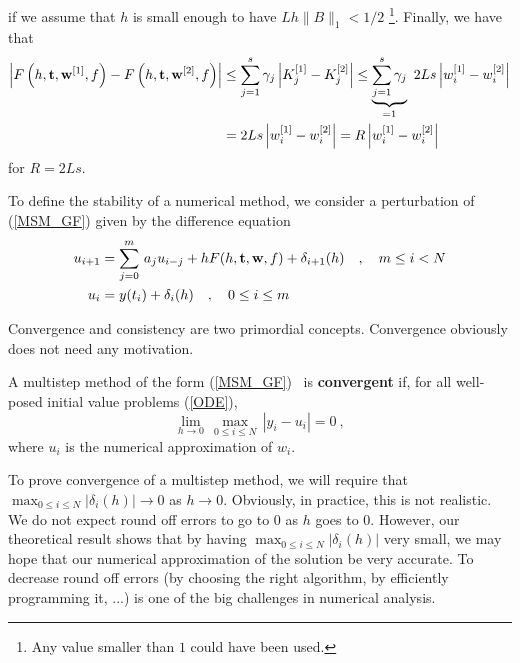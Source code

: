 \begin{enumerate}
\[\]
if we assume that $h$ is small enough to have $L h\|B\|_1 < 1/2$
\footnote{Any value smaller than $1$ could have been used.}.
Finally, we have that
\begin{align*}
\left| F\left(h,\mathbf{t},\mathbf{w}^{[1]},f\right)
- F\left(h,\mathbf{t},\mathbf{w}^{[2]},f\right) \right|
&\leq \sum_{j=1}^s \gamma_j \left| K_j^{[1]} - K_j^{[2]}\right|
\leq \underbrace{\sum_{j=1}^s \gamma_j}_{=1}
\ 2 L s \left| w_i^{[1]} - w_i^{[2]} \right| \\
&= 2 L s \left| w_i^{[1]} - w_i^{[2]} \right|
= R \left| w_i^{[1]} - w_i^{[2]} \right|
\end{align*}
for $\displaystyle R = 2 L s$.
\end{enumerate}

To define the stability of a numerical method, we consider a perturbation
of (\ref{MSM_GF}) given by the difference equation
\begin{equation} \label{MSM_GFpertub}
\begin{split}
u_{i+1} &= \sum_{j=0}^m\,a_ju_{i-j} + h F(h,\mathbf{t},\mathbf{w},f)
+ \delta_{i+1}(h) \quad, \quad m\leq i < N \\
u_i &= y(t_i) + \delta_i(h) \quad, \quad 0 \leq i \leq m
\end{split}
\end{equation}

Convergence and consistency are two primordial concepts.  Convergence
obviously does not need any motivation. 

\begin{defn}
A multistep method of the form (\ref{MSM_GF}) \footnotemark\ is
{\bfseries convergent} if,
for all well-posed initial value problems (\ref{ODE}),
\[
\lim_{h \rightarrow 0}\,\max_{0\leq i \leq N} \,|y_i - u_i| = 0 \ ,
\]
where $u_i$ is the numerical approximation of $w_i$.
\label{methodConv}
\end{defn}


\begin{rmk}
To prove convergence of a multistep method, we will require that
$\displaystyle \max_{0\leq i \leq N} |\delta_i(h)| \to 0$ as $h\to 0$.
Obviously, in practice, this is not realistic.  We do not expect
round off errors to go to $0$ as $h$ goes to $0$.  However, our
theoretical result shows that by having 
$\displaystyle \max_{0\leq i \leq N} |\delta_i(h)|$ very small,
we may hope that our numerical approximation of the solution be
very accurate.  To decrease round off errors (by choosing
the right algorithm, by efficiently programming it, ...) is one of
the big challenges in numerical analysis.
\end{rmk}

